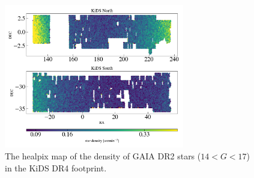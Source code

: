 \documentclass[fleqn,usenatbib,useAMS]{mnras}
\begin{document}

\begin{figure}
\includegraphics[width=0.7\textwidth, height = 0.5\textwidth]{figures_tmp/sys/scatter_nstar.png}
\caption{\label{fig:scatter_stardens} The healpix map of the density of GAIA DR2 stars ($14<G<17$) in the KiDS DR4 footprint.} 
\end{figure}
\end{document}
